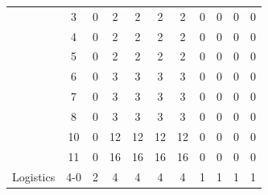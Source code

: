 \documentclass{article}
\theoremstyle{remark}
\begin{document}
{\begin{table}[ht]
\begin{tabular}{|cc||c||c|c|c|c||c|c|c|c|}
                                              & 3                        & 0                        & 2                  & 2                  & 2                 & 2                 & 0                  & 0                  & 0                 & 0                  \\ \cline{2-11} 
                                              & 4                        & 0                        & 2                  & 2                  & 2                 & 2                 & 0                  & 0                  & 0                 & 0                  \\ \cline{2-11} 
                                              & 5                        & 0                        & 2                  & 2                  & 2                 & 2                 & 0                  & 0                  & 0                 & 0                  \\ \cline{2-11} 
                                              & 6                        & 0                        & 3                  & 3                  & 3                 & 3                 & 0                  & 0                  & 0                 & 0                  \\ \cline{2-11} 
                                              & 7                        & 0                        & 3                  & 3                  & 3                 & 3                 & 0                  & 0                  & 0                 & 0                  \\ \cline{2-11} 
                                              & 8                        & 0                        & 3                  & 3                  & 3                 & 3                 & 0                  & 0                  & 0                 & 0                  \\ \cline{2-11} 
                                              & 10                       & 0                        & 12                 & 12                 & 12                & 12                & 0                  & 0                  & 0                 & 0                  \\ \cline{2-11} 
                                              & 11                       & 0                        & 16                 & 16                 & 16                & 16                & 0                  & 0                  & 0                 & 0                  \\ \hline \hline
\multirow{15}{*}{Logistics}                   & 4-0                      & 2                        & 4                  & 4                  & 4                 & 4                 & 1                  & 1                  & 1                 & 1                  \\ \cline{2-11} 

\end{tabular}
\end{table}}
\end{document}
